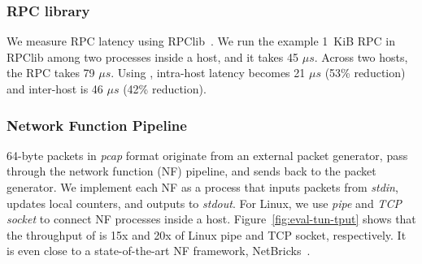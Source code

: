 



\subsubsection{RPC library}
\quad

We measure RPC latency using RPClib~\cite{rpclib}.
We run the example 1~KiB RPC in RPClib among two processes inside a host, and it takes 45 $\mu s$. Across two hosts, the RPC takes 79 $\mu s$.
Using \sys{}, intra-host latency becomes 21 $\mu s$ (53\% reduction) and inter-host is 46 $\mu s$ (42\% reduction).


\subsubsection{Network Function Pipeline}
\quad

64-byte packets in \emph{pcap} format originate from an external packet generator, pass through the network function (NF) pipeline, and sends back to the packet generator.
We implement each NF as a process that inputs packets from \emph{stdin}, updates local counters, and outputs to \emph{stdout}.
For Linux, we use \emph{pipe} and \emph{TCP socket} to connect NF processes inside a host.
Figure~\ref{fig:eval-tun-tput} shows that the throughput of \sys{} is 15x and 20x of Linux pipe and TCP socket, respectively.
It is even close to a state-of-the-art NF framework, NetBricks~\cite{panda2016netbricks}.


